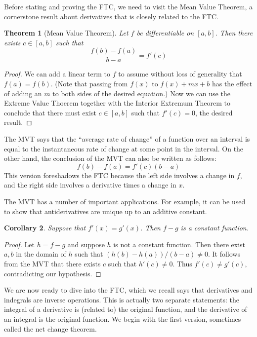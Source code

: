 \documentclass[11pt,oneside]{amsbook}
\theoremstyle{definition}
\theoremstyle{plain}
\newtheorem{theorem}{Theorem}[section]
\newtheorem{corollary}[theorem]{Corollary}
\theoremstyle{definition}
\theoremstyle{remark}
\numberwithin{equation}{section}
\numberwithin{figure}{section}
\begin{document}
Before stating and proving the FTC, we need to visit the Mean Value Theorem, a cornerstone result about derivatives that is closely related to the FTC.

\begin{theorem}[Mean Value Theorem]
  Let $f$ be differentiable on $[a,b]$. Then there exists $c\in[a,b]$ such that
  \[\frac{f(b)-f(a)}{b-a}=f'(c)
  \]
\end{theorem}

\begin{proof}
  We can add a linear term to $f$ to assume without loss of generality that $f(a)=f(b)$. (Note that passing from $f(x)$ to $f(x)+mx+b$ has the effect of adding an $m$ to both sides of the desired equation.) Now we can use the Extreme Value Thoerem together with the Interior Extremum Theorem to conclude that there must exist $c\in[a,b]$ such that $f'(c)=0$, the desired result.
\end{proof}

The MVT says that the ``average rate of change'' of a function over an interval is equal to the instantaneous rate of change at some point in the interval. On the other hand, the conclusion of the MVT can also be written as follows:
\[f(b)-f(a)=f'(c)(b-a)
\]
This version foreshadows the FTC because the left side involves a change in $f$, and the right side involves a derivative times a change in $x$.

The MVT has a number of important applications. For example, it can be used to show that antiderivatives are unique up to an additive constant.

\begin{corollary}
  Suppose that $f'(x)=g'(x)$. Then $f-g$ is a constant function.
\end{corollary}

\begin{proof}
  Let $h=f-g$ and suppose $h$ is not a constant function. Then there exist $a,b$ in the domain of $h$ such that $(h(b)-h(a))/(b-a)\neq0$. It follows from the MVT that there exists $c$ such that $h'(c)\neq0$. Thus $f'(c)\neq g'(c)$, contradicting our hypothesis.
\end{proof}

We are now ready to dive into the FTC, which we recall says that derivatives and indegrals are inverse operations. This is actually two separate statements: the integral of a derivative is (related to) the original function, and the derivative of an integral is the original function. We begin with the first version, sometimes called the net change theorem.
\end{document}
